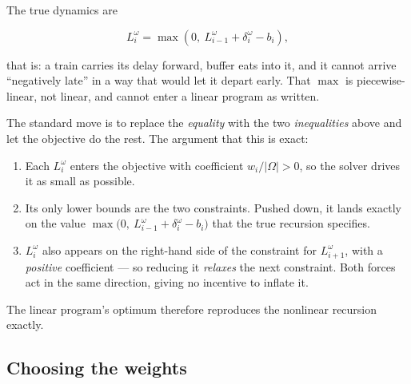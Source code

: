 \documentclass[11pt,a4paper]{article}
\begin{document}
The true dynamics are

\[
L_i^\omega = \max\!\left(0,\ L_{i-1}^\omega + \delta_i^\omega - b_i\right),
\]

that is: a train carries its delay forward, buffer eats into it, and it cannot arrive
``negatively late'' in a way that would let it depart early. That $\max$ is
piecewise-linear, not linear, and cannot enter a linear program as written.

The standard move is to replace the \emph{equality} with the two \emph{inequalities} above
and let the objective do the rest. The argument that this is exact:

\begin{enumerate}[leftmargin=1.6em,itemsep=0.25em]
  \item Each $L_i^\omega$ enters the objective with coefficient $w_i / |\Omega| > 0$, so the
        solver drives it as small as possible.
  \item Its only lower bounds are the two constraints. Pushed down, it lands exactly on
        the value $\max\bigl(0,\ L_{i-1}^\omega + \delta_i^\omega - b_i\bigr)$ that the
        true recursion specifies.
  \item $L_i^\omega$ also appears on the right-hand side of the constraint for
        $L_{i+1}^\omega$, with a \emph{positive} coefficient --- so reducing it
        \emph{relaxes} the next constraint. Both forces act in the same direction, giving
        no incentive to inflate it.
\end{enumerate}

The linear program's optimum therefore reproduces the nonlinear recursion exactly.

\medskip
\noindent{}

\subsection*{Choosing the weights}
\end{document}
